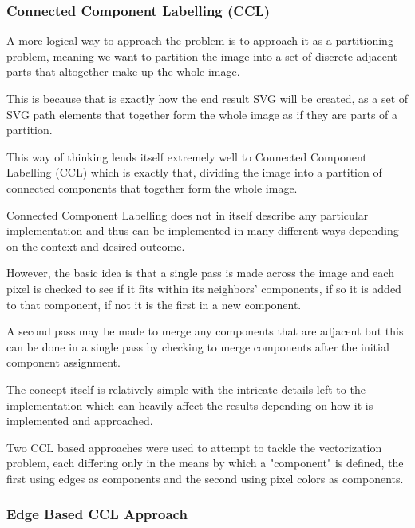 \documentclass[12pt]{article}
\newcommand{\sentence}{} %
\begin{document}
    \subsubsection{Connected Component Labelling (CCL)}\label{subsubsec:connected-component-labelling-(ccl)}

    \tab
    A more logical way to approach the problem is to approach it as a partitioning problem, meaning we want to
    partition the image into a set of discrete adjacent parts that altogether make up the whole image.
    \sentence
    This is because that is exactly how the end result SVG will be created, as a set of SVG path elements that together
    form the whole image as if they are parts of a partition.
    \sentence
    This way of thinking lends itself extremely well to Connected Component Labelling (CCL) which is exactly that,
    dividing the image into a partition of connected components that together form the whole image.
    \sentence
    \sentence
    Connected Component Labelling does not in itself describe any particular implementation and thus can be
    implemented in many different ways depending on the context and desired outcome.
    \sentence
    However, the basic idea is that a single pass is made across the image and each pixel is checked to see if it
    fits within its neighbors' components, if so it is added to that component, if not it is the first in a new
    component.
    \sentence
    A second pass may be made to merge any components that are adjacent but this can be done in a single pass
    by checking to merge components after the initial component assignment.
    \sentence
    The concept itself is relatively simple with the intricate details left to the implementation which can heavily
    affect the results depending on how it is implemented and approached.
    \sentence
    Two CCL based approaches were used to attempt to tackle the vectorization problem, each differing only in the
    means by which a "component" is defined, the first using edges as components and the second using pixel colors as
    components.

    \subsubsection{Edge Based CCL Approach}\label{subsubsec:edge-based-ccl-approach}
\end{document}
